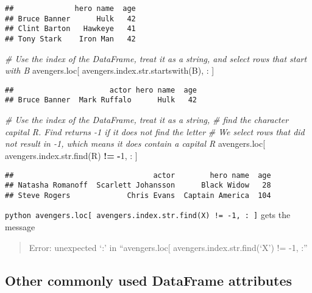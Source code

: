 \documentclass[
]{book}
\newenvironment{Shaded}{\begin{snugshade}}{\end{snugshade}}
\newcommand{\BuiltInTok}[1]{#1}
\newcommand{\CommentTok}[1]{\textcolor[rgb]{0.56,0.35,0.01}{\textit{#1}}}
\newcommand{\DecValTok}[1]{\textcolor[rgb]{0.00,0.00,0.81}{#1}}
\newcommand{\NormalTok}[1]{#1}
\newcommand{\OperatorTok}[1]{\textcolor[rgb]{0.81,0.36,0.00}{\textbf{#1}}}
\newcommand{\StringTok}[1]{\textcolor[rgb]{0.31,0.60,0.02}{#1}}
\begin{document}
\begin{verbatim}
##              hero name  age
## Bruce Banner      Hulk   42
## Clint Barton   Hawkeye   41
## Tony Stark    Iron Man   42
\end{verbatim}

\begin{Shaded}
\begin{Highlighting}[]
\CommentTok{\# Use the index of the DataFrame, treat it as a string, and select rows that start with B}
\NormalTok{avengers.loc[ avengers.index.}\BuiltInTok{str}\NormalTok{.startswith(}\StringTok{\textquotesingle{}B\textquotesingle{}}\NormalTok{), : ]}
\end{Highlighting}
\end{Shaded}

\begin{verbatim}
##                      actor hero name  age
## Bruce Banner  Mark Ruffalo      Hulk   42
\end{verbatim}

\begin{Shaded}
\begin{Highlighting}[]
\CommentTok{\# Use the index of the DataFrame, treat it as a string,}
\CommentTok{\# find the character capital R. Find returns {-}1 if it does not find the letter}
\CommentTok{\# We select rows that did not result in {-}1, which means it does contain a capital R}
\NormalTok{avengers.loc[ avengers.index.}\BuiltInTok{str}\NormalTok{.find(}\StringTok{\textquotesingle{}R\textquotesingle{}}\NormalTok{) }\OperatorTok{!=} \OperatorTok{{-}}\DecValTok{1}\NormalTok{, : ]}
\end{Highlighting}
\end{Shaded}

\begin{verbatim}
##                                actor        hero name  age
## Natasha Romanoff  Scarlett Johansson      Black Widow   28
## Steve Rogers             Chris Evans  Captain America  104
\end{verbatim}

\texttt{python\ avengers.loc{[}\ avengers.index.str.find(\textquotesingle{}X\textquotesingle{})\ !=\ -1,\ :\ {]}} gets the message

\begin{quote}
Error: unexpected `:' in ``avengers.loc{[} avengers.index.str.find(`X') != -1, :''
\end{quote}

\hypertarget{other-commonly-used-dataframe-attributes}{%
\subsection{Other commonly used DataFrame attributes}\label{other-commonly-used-dataframe-attributes}}
\end{document}
